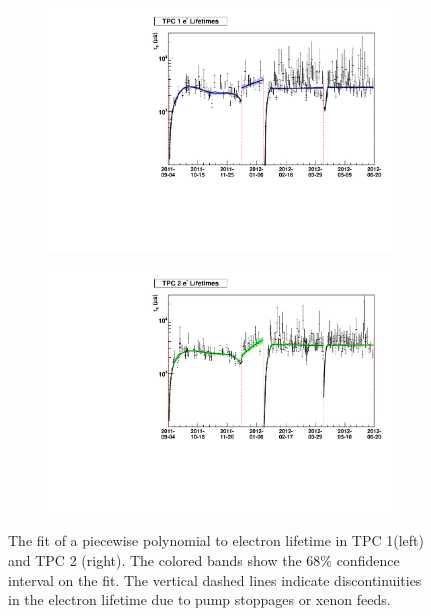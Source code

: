 \documentclass[herrin-thesis.tex]{subfiles}
\begin{document}
\begin{figure}[htbp]
\begin{subfigure}[b]{0.5\linewidth}
\centering
\includegraphics[width=1.0\columnwidth]{./plots/el_trend_tpc1.pdf}
\end{subfigure}%
\begin{subfigure}[b]{0.5\linewidth}
\centering
\includegraphics[width=1.0\columnwidth]{./plots/el_trend_tpc2.pdf}
\end{subfigure}
\caption[Fit to time-varying electron lifetime]{The fit of a piecewise polynomial to electron lifetime in TPC 1(left) and TPC 2 (right). The colored bands show the 68\% confidence interval on the fit. The vertical dashed lines indicate discontinuities in the electron lifetime due to pump stoppages or xenon feeds.}
\label{fig:err_fits}
\end{figure}
\end{document}
